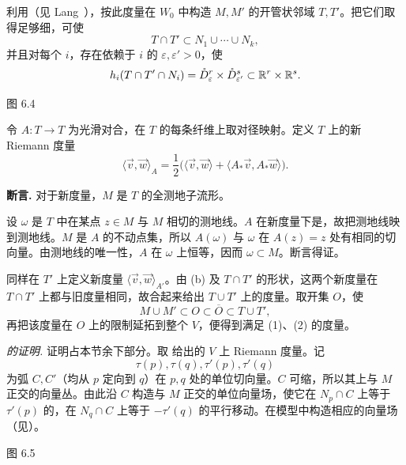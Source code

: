利用（见 Lang~\cite[p.~73]{ref03}），按此度量在 $W_0$ 中构造 $M,M'$ 的开管状邻域 $T,T'$。把它们取得足够细，可使
\[
  T\cap T'\subset N_1\cup\cdots\cup N_k,
\]
并且对每个 $i$，存在依赖于 $i$ 的 $\varepsilon,\varepsilon'>0$，使
\[
  h_i(T\cap T'\cap N_i)
  =\mathring D^r_\varepsilon\times\mathring D^s_{\varepsilon'}
  \subset\mathbb{R}^r\times\mathbb{R}^s.
\]

\begin{center}
  \FigSixFour

  \label{fig:6.4}图 6.4
\end{center}

令 $A:T\to T$ 为光滑对合，在 $T$ 的每条纤维上取对径映射。定义 $T$ 上的新 Riemann 度量
\[
  \langle\vec v,\vec w\rangle_A
  =\frac12\bigl(
    \langle\vec v,\vec w\rangle
    +\langle A_*\vec v,A_*\vec w\rangle
  \bigr).
\]

\par\medskip\noindent\textbf{断言.}\quad\label{proof:6-8-page76}
对于新度量，$M$ 是 $T$ 的全测地子流形。

\Proof 设 $\omega$ 是 $T$ 中在某点 $z\in M$ 与 $M$ 相切的测地线。$A$ 在新度量下是，故把测地线映到测地线。$M$ 是 $A$ 的不动点集，所以 $A(\omega)$ 与 $\omega$ 在 $A(z)=z$ 处有相同的切向量。由测地线的唯一性，$A$ 在 $\omega$ 上恒等，因而 $\omega\subset M$。断言得证。
\EndProof

同样在 $T'$ 上定义新度量 $\langle\vec v,\vec w\rangle_{A'}$。由 (b) 及 $T\cap T'$ 的形状，这两个新度量在 $T\cap T'$ 上都与旧度量相同，故合起来给出 $T\cup T'$ 上的度量。取开集 $O$，使
\[
  M\cup M'\subset O\subset\overline O\subset T\cup T',
\]
再把该度量在 $O$ 上的限制延拓到整个 $V$，便得到满足 (1)、(2) 的度量。
\EndProof

\par\medskip\noindent\textit{ 的证明.}\quad
证明占本节余下部分。取 给出的 $V$ 上 Riemann 度量。记
\[
  \tau(p),\tau(q),\tau'(p),\tau'(q)
\]
为弧 $C,C'$（均从 $p$ 定向到 $q$）在 $p,q$ 处的单位切向量。$C$ 可缩，所以其上与 $M$ 正交的向量丛。由此沿 $C$ 构造与 $M$ 正交的单位向量场，使它在 $N_p\cap C$ 上等于 $\tau'(p)$ 的，在 $N_q\cap C$ 上等于 $-\tau'(q)$ 的平行移动。在模型中构造相应的向量场（见）。

\begin{center}
  \FigSixFive

  \label{fig:6.5}图 6.5
\end{center}

